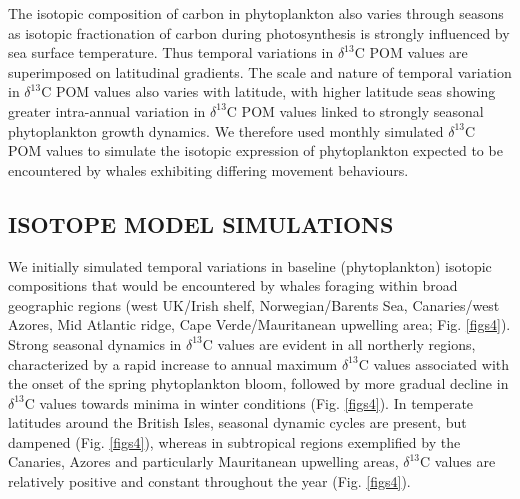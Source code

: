 \documentclass[a4paper,12pt]{article}
\begin{document}
The isotopic composition of carbon in phytoplankton also varies through seasons as isotopic fractionation of carbon during photosynthesis is strongly influenced by sea surface temperature\cite{laws1995dependence}. 
Thus temporal variations in $\delta^{13}$C POM values are superimposed on latitudinal gradients. 
The scale and nature of temporal variation in $\delta^{13}$C POM values also varies with latitude, with higher latitude seas showing greater intra-annual variation in $\delta^{13}$C POM values linked to strongly seasonal phytoplankton growth dynamics. 
We therefore used monthly simulated $\delta^{13}$C POM values to simulate the isotopic expression of phytoplankton expected to be encountered by whales exhibiting differing movement behaviours.
 
\subsection*{ISOTOPE MODEL SIMULATIONS}
We initially simulated temporal variations in baseline (phytoplankton) isotopic compositions that would be encountered by whales foraging within broad geographic regions (west UK/Irish shelf, Norwegian/Barents Sea, Canaries/west Azores, Mid Atlantic ridge, Cape Verde/Mauritanean upwelling area; Fig. \ref{figs4}). 
Strong seasonal dynamics in $\delta^{13}$C values are evident in all northerly regions, characterized by a rapid increase to annual maximum $\delta^{13}$C values associated with the onset of the spring phytoplankton bloom, followed by more gradual decline in $\delta^{13}$C values towards minima in winter conditions (Fig. \ref{figs4}). 
In temperate latitudes around the British Isles, seasonal dynamic cycles are present, but dampened (Fig. \ref{figs4}), whereas in subtropical regions exemplified by the Canaries, Azores and particularly Mauritanean upwelling areas, $\delta^{13}$C values are relatively positive and constant throughout the year (Fig. \ref{figs4}).
 
\end{document}
